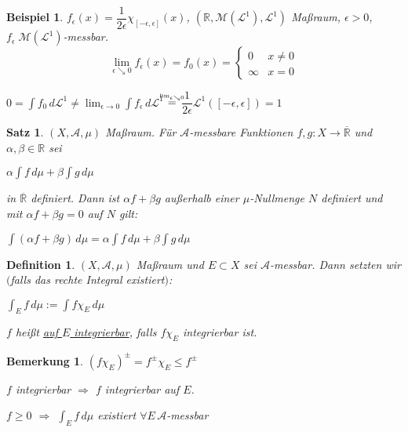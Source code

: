\documentclass[11pt]{memoir}
\theoremstyle{changebreak}
\newtheorem{Definition}{Definition}[chapter]
\newtheorem{Bemerkung}{Bemerkung}[chapter]
\newtheorem{Beispiel}{Beispiel}[chapter]
\newtheorem{Satz}{Satz}[chapter]
\newcommand\overequal[1]{\mathrel{\overset{\makebox[0pt]{\mbox{\normalfont\tiny\sffamily $ #1 $}}}{=}}}
\begin{document}
\begin{Beispiel}
$f_{\epsilon} (x) = \dfrac{1}{2\epsilon} \chi_{[-\epsilon, \epsilon]}(x)$,
$(\mathbb R, \mathscr M(\mathscr L^1), \mathscr L^1)$ Maßraum, $\epsilon > 0$, $f_\epsilon \; \mathscr M(\mathscr L^1)$-messbar.
\begin{equation}
	\lim_{\epsilon \searrow 0} f_\epsilon (x) = f_0 (x) =
	\begin{cases}
		0 & x \ne 0 \\
		\infty & x = 0
	\end{cases}
\end{equation}
\begin{center}
	$0 = \int f_0 \, d\mathscr L^1 \ne \lim_{\epsilon \rightarrow 0} \int f_\epsilon \, d\mathscr L^1$ $\overequal{\lim_{\epsilon \searrow 0}}$ $\dfrac{1}{2\epsilon} \mathscr L^1([-\epsilon, \epsilon]) =1$
\end{center}
\end{Beispiel}


\begin{Satz}
$(X, \mathscr A, \mu)$ Maßraum. Für $\mathscr A$-messbare Funktionen $f, g: X \rightarrow \overline{\mathbb R} $ und $\alpha, \beta \in \mathbb R$ sei 
\begin{center}
	$\alpha\int f \, d\mu + \beta \int g \, d\mu$
\end{center} 
in $\overline{\mathbb R}$ definiert. Dann ist $\alpha f + \beta g$ außerhalb einer $\mu$-Nullmenge $N$ definiert und mit $\alpha f + \beta g = 0$ auf $N$ gilt: \\
\begin{center}
	$\int (\alpha f + \beta g) \, d\mu = \alpha \int f \, d\mu + \beta \int g \, d\mu$
\end{center}
\end{Satz}

\begin{Definition}
$(X, \mathscr A, \mu)$ Maßraum und $E \subset X$ sei $\mathscr A$-messbar. Dann setzten wir $($falls das rechte Integral existiert$)$:
\begin{center}
	$\int_E f \, d\mu := \int f \chi_E \, d\mu$
\end{center}
$f$ heißt \underline{auf $E$ integrierbar}, falls $f \chi_E$ integrierbar ist.
\end{Definition}

\begin{Bemerkung}
$(f \chi_E)^\pm = f^\pm \chi_E \leq f^\pm$ 
\par\bigskip
$f$ integrierbar $\Rightarrow$ $f$ integrierbar auf $E$. 
\par
$f \geq 0$ $\Rightarrow$ $\int_E f \, d\mu$ existiert $\forall E \, \mathscr A$-messbar
\end{Bemerkung}
\end{document}
